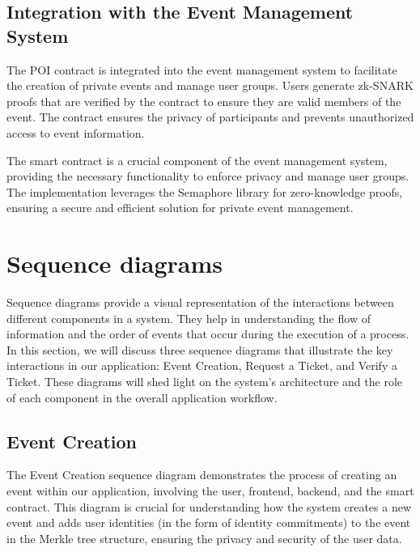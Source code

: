 \subsection{Integration with the Event Management System}

The POI contract is integrated into the event management system to facilitate the creation of private events and manage user groups. Users generate zk-SNARK proofs that are verified by the contract to ensure they are valid members of the event. The contract ensures the privacy of participants and prevents unauthorized access to event information.

The smart contract is a crucial component of the event management system, providing the necessary functionality to enforce privacy and manage user groups. The implementation leverages the Semaphore library for zero-knowledge proofs, ensuring a secure and efficient solution for private event management.

\section{Sequence diagrams}
Sequence diagrams provide a visual representation of the interactions between different components in a system. They help in understanding the flow of information and the order of events that occur during the execution of a process. In this section, we will discuss three sequence diagrams that illustrate the key interactions in our application: Event Creation, Request a Ticket, and Verify a Ticket. These diagrams will shed light on the system's architecture and the role of each component in the overall application workflow.

\subsection{Event Creation}
The Event Creation sequence diagram demonstrates the process of creating an event within our application, involving the user, frontend, backend, and the smart contract. This diagram is crucial for understanding how the system creates a new event and adds user identities (in the form of identity commitments) to the event in the Merkle tree structure, ensuring the privacy and security of the user data.

